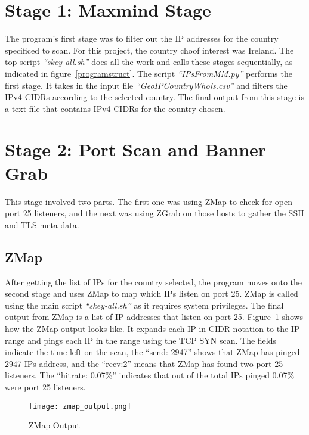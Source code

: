 \section{Stage 1: Maxmind Stage}
\label{stage1}
The program's first stage was to filter out the IP addresses for the country specificed to scan. For this project, the country choof interest was Ireland. 
The top script \textit{``skey-all.sh''} does all the work and calls these stages sequentially, as indicated in figure~\ref*{programstruct}. The script \textit{``IPsFromMM.py''} performs the first stage. 
It takes in the input file \textit{``GeoIPCountryWhois.csv''} and filters the IPv4 CIDRs according to the selected country. The final output from 
this stage is a text file that contains IPv4 CIDRs for the country chosen.

\section{Stage 2: Port Scan and Banner Grab}
\label{stage2}
This stage involved two parts. The first one was using ZMap to check for open port 25 listeners, and the next was using ZGrab on those hosts 
to gather the SSH and TLS meta-data.

\subsection{ZMap}
After getting the list of IPs for the country selected, the program moves onto the second stage and uses ZMap to map which IPs listen on port 25. ZMap is called 
using the main script \textit{``skey-all.sh''} as it requires system privileges. The final output from ZMap is a list of IP addresses that listen on port 25. 
Figure~\ref*{fig:zmapout} shows how the ZMap output looks like. It expands each IP in CIDR notation to the IP range and pings each IP in 
the range using the TCP SYN scan. The fields indicate the time left on the scan, the ``send: 2947'' shows that ZMap has pinged 2947 IPs address, 
and the ``recv:2'' means that ZMap has found two port 25 listeners. The ``hitrate: 0.07\%'' indicates that out of the total IPs pinged 0.07\%  
were port 25 listeners.  
\begin{figure}[h]
    \centering
    \texttt{[image: zmap\_output.png]}
    \caption{ZMap Output}
    \label{fig:zmapout}
\end{figure} 


